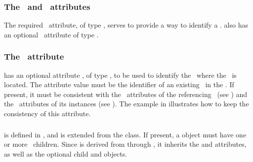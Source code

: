 \subsubsection{The \idAtt\ and \nameAtt\ attributes}
\label{def:SpeciesType:idAndName}

The required \idAtt\ attribute, of type \SIdPT, serves to provide a way to identify a \speciesType.  also has an optional \nameAtt\ attribute of type \stringPT. 
               
\subsubsection{The \compartmentAtt\ attribute}
\label{def:SpeciesType:compartment}

 has an optional attribute \compartmentAtt, of type \SIdRefPT, to be used to identify the \compartment\ where the \speciesType\ is located. The attribute value must be the identifier of an existing \compartment\ in the \model. If present, it must be consistent with the \compartmentAtt\ attributes of the referencing \species\ (see ) and the \compartmentReferenceAtt\ attributes of its instances (see ). The example in  illustrates how to keep the consistency of this attribute.

\subsubsection{}
\label{def:ListOfSpeciesFeatureTypes}

 is defined in , and is extended from the  class. If present, \mBlockChangedBegin{\revTwentyTwentyMarch} a  object \mBlockChangedEnd{\revTwentyTwentyMarch} must have one or more \SpeciesFeatureType\ children.  Since  is derived from  through , it inherits the  and  attributes, as well as the optional \mBlockChangedBegin{\revTwentyTwentyMarch}child\mBlockChangedEnd{\revTwentyTwentyMarch}  and  objects. 

